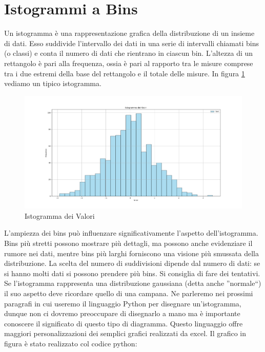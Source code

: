 \documentclass[a4paper,12pt]{article}
\begin{document}
\section{Istogrammi a Bins}
Un istogramma è una rappresentazione grafica della distribuzione di un insieme di dati. Esso suddivide l'intervallo dei dati in una serie di intervalli chiamati bins (o classi) e conta il numero di dati che rientrano in ciascun bin. L'altezza di un rettangolo è pari alla frequenza, ossia è pari al rapporto tra le misure  comprese tra i due estremi della base del rettangolo  e il totale delle misure.  In figura \ref{fig:istogrammagenerico} vediamo un tipico istogramma.

\begin{figure}[h!]
    \centering
    \includegraphics[width=\linewidth]{istogrammagenerico.png}
    \caption{Istogramma dei Valori}
    \label{fig:istogrammagenerico}
\end{figure}


 
L'ampiezza dei bins può influenzare significativamente l'aspetto dell'istogramma. Bins più stretti possono mostrare più dettagli, ma possono anche evidenziare il rumore nei dati, mentre bins più larghi forniscono una visione più smussata della distribuzione. La scelta del numero di suddivisioni dipende dal numero di dati: se si hanno molti dati si possono prendere più bins. Si consiglia di fare dei tentativi. Se l'istogramma rappresenta una distribuzione gaussiana  (detta anche ''normale``) il suo aspetto deve ricordare quello di una campana. Ne parleremo nei prossimi paragrafi in cui useremo il linguaggio Python per disegnare un'istogramma, dunque non ci dovremo preoccupare di disegnarlo a mano ma è importante conoscere il significato di questo tipo di diagramma. Questo linguaggio offre maggiori personalizzazioni dei semplici grafici realizzati da excel. Il grafico in figura è stato realizzato col codice python:
\end{document}
